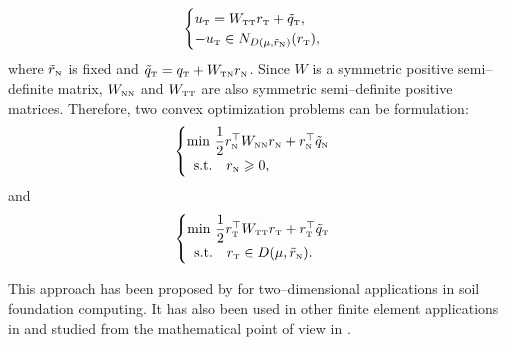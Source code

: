 {\begin{equation}
  \label{eq:AO-2}
  \begin{cases}
    u_\t = W_{\t\t} r_\t + \tilde q_\t, \\
   -u_\t \in N_{D(\mu,\tilde r_{\n})}(r_\t),
  \end{cases}
\end{equation}
where $\tilde r_{\hbox{\tiny{N}}}$ is fixed and $\tilde q_{\hbox{\tiny{T}}} = q_{\hbox{\tiny{T}}} + W_{{\hbox{\tiny{T}}}{\hbox{\tiny{N}}}}r_{\hbox{\tiny{N}}}$. Since $W$ is a symmetric positive semi--definite  matrix, $W_{{\hbox{\tiny{N}}}{\hbox{\tiny{N}}}}$ and $W_{{\hbox{\tiny{T}}}{\hbox{\tiny{T}}}}$ are also symmetric semi--definite positive matrices.
Therefore, two convex optimization problems can be formulation:
 \begin{equation}
  \label{eq:AO-3}
  \begin{cases}
    \min\, \Frac 1 2 r_\n^\top  W_{\n\n} r_\n + r_\n^\top \tilde q_\n \\
    \begin{array}{ll}
    \text{s.t.} & r_\n \geq 0,
  \end{array}\end{cases}
\end{equation}
and
\begin{equation}
  \label{eq:AO-4}
  \begin{cases}
    \min\,  \Frac 1 2 r_\t^\top W _{\t\t} r_\t +  r_\t^\top \tilde q_\t \\
    \begin{array}{ll}
     \text{s.t.}  & r_\t \in D(\mu,\tilde r_{\n}).
  \end{array}
\end{cases}
\end{equation}

This approach has been proposed by \cite{Panagiotopoulos_IA1975} for two--dimensional applications in soil foundation computing. It has also been used  in other finite element applications  in \citep{Barbosa.Feijoo_CISM1985,Tzaferopoulos_CS1993} and studied from the mathematical point of view in \cite{Haslinger.Panagiotopoulos_PRSE1984,Haslinger.ea1996}. 

}
